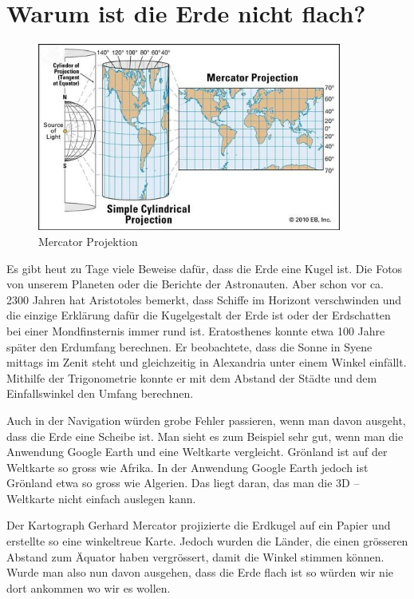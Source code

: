 

\section{Warum ist die Erde nicht flach?}

\begin{figure}
	\begin{center}
		\includegraphics[width=10cm]{papers/nav/bilder/projektion.png}
		\caption[Mercator Projektion]{Mercator Projektion}
	\end{center}	
\end{figure}

Es gibt heut zu Tage viele Beweise dafür, dass die Erde eine Kugel ist. 
Die Fotos von unserem	Planeten oder die Berichte der Astronauten. 
Aber schon vor ca. 2300 Jahren hat Aristotoles bemerkt, dass Schiffe im Horizont verschwinden und die einzige Erklärung dafür die Kugelgestalt der Erde ist oder der Erdschatten bei einer Mondfinsternis immer rund ist. 
Eratosthenes konnte etwa 100 Jahre später den Erdumfang berechnen. 
Er beobachtete, dass die Sonne in Syene mittags im Zenit steht und gleichzeitig in Alexandria unter einem Winkel einfällt. 
Mithilfe der Trigonometrie konnte er mit dem Abstand der Städte und dem Einfallswinkel den Umfang berechnen.

Auch in der Navigation würden grobe Fehler passieren, wenn man davon ausgeht, dass die Erde eine Scheibe ist. 
Man sieht es zum Beispiel sehr gut, wenn man die Anwendung Google Earth und eine Weltkarte vergleicht. 
Grönland ist auf der Weltkarte so gross wie Afrika. 
In der Anwendung Google Earth jedoch ist Grönland etwa so gross wie Algerien. 
Das liegt daran, das man die 3D – Weltkarte nicht einfach auslegen kann. 

Der Kartograph Gerhard Mercator projizierte die Erdkugel auf ein Papier und erstellte so eine winkeltreue Karte. 
Jedoch wurden die Länder, die einen grösseren Abstand zum Äquator haben vergrössert, damit die Winkel stimmen können. 
Wurde man also nun davon ausgehen, dass die Erde flach ist so würden wir nie dort ankommen wo wir es wollen.